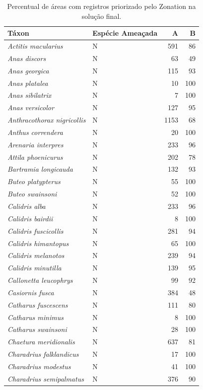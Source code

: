 \documentclass[
  oneside]{scrbook}
\begin{document}
\begin{longtable}[t]{>{}llrr}
\caption{\label{tab:1}Percentual de áreas com registros priorizado pelo Zonation na solução final.}\\
\toprule
Táxon & Espécie Ameaçada & A & B\\
\midrule
\em{Actitis macularius} & N & 591 & 86\\
\em{Anas discors} & N & 63 & 49\\
\em{Anas georgica} & N & 115 & 93\\
\em{Anas platalea} & N & 10 & 100\\
\em{Anas sibilatrix} & N & 7 & 100\\
\addlinespace
\em{Anas versicolor} & N & 127 & 95\\
\em{Anthracothorax nigricollis} & N & 1153 & 68\\
\em{Anthus correndera} & N & 20 & 100\\
\em{Arenaria interpres} & N & 233 & 96\\
\em{Attila phoenicurus} & N & 202 & 78\\
\addlinespace
\em{Bartramia longicauda} & N & 132 & 93\\
\em{Buteo platypterus} & N & 55 & 100\\
\em{Buteo swainsoni} & N & 52 & 100\\
\em{Calidris alba} & N & 233 & 96\\
\em{Calidris bairdii} & N & 8 & 100\\
\addlinespace
\em{Calidris fuscicollis} & N & 281 & 94\\
\em{Calidris himantopus} & N & 65 & 100\\
\em{Calidris melanotos} & N & 239 & 94\\
\em{Calidris minutilla} & N & 139 & 95\\
\em{Callonetta leucophrys} & N & 99 & 92\\
\addlinespace
\em{Casiornis fusca} & N & 384 & 48\\
\em{Catharus fuscescens} & N & 111 & 80\\
\em{Catharus minimus} & N & 8 & 100\\
\em{Catharus swainsoni} & N & 28 & 100\\
\em{Chaetura meridionalis} & N & 637 & 81\\
\addlinespace
\em{Charadrius falklandicus} & N & 17 & 100\\
\em{Charadrius modestus} & N & 41 & 100\\
\em{Charadrius semipalmatus} & N & 376 & 90\\

\end{longtable}
\end{document}
